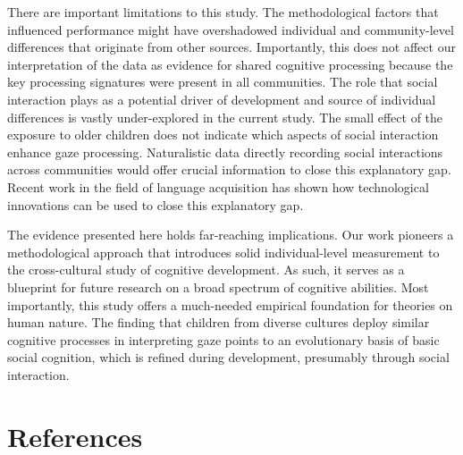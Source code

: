 \documentclass[
  man,floatsintext]{apa6}
\begin{document}
There are important limitations to this study. The methodological factors that influenced performance might have overshadowed individual and community-level differences that originate from other sources. Importantly, this does not affect our interpretation of the data as evidence for shared cognitive processing because the key processing signatures were present in all communities. The role that social interaction plays as a potential driver of development and source of individual differences is vastly under-explored in the current study. The small effect of the exposure to older children does not indicate which aspects of social interaction enhance gaze processing. Naturalistic data directly recording social interactions across communities would offer crucial information to close this explanatory gap. Recent work in the field of language acquisition has shown how technological innovations can be used to close this explanatory gap.

The evidence presented here holds far-reaching implications. Our work pioneers a methodological approach that introduces solid individual-level measurement to the cross-cultural study of cognitive development. As such, it serves as a blueprint for future research on a broad spectrum of cognitive abilities. Most importantly, this study offers a much-needed empirical foundation for theories on human nature. The finding that children from diverse cultures deploy similar cognitive processes in interpreting gaze points to an evolutionary basis of basic social cognition, which is refined during development, presumably through social interaction.

\newpage

\hypertarget{references}{%
\section{References}\label{references}}
\end{document}
